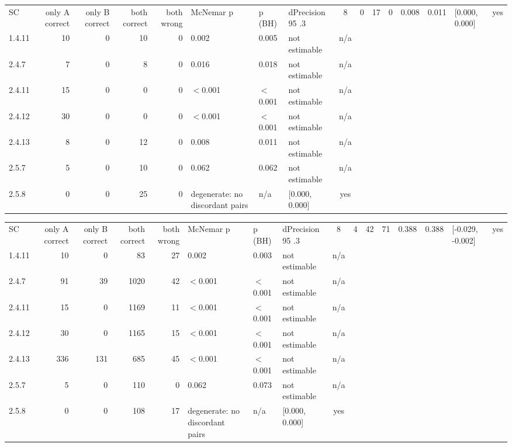 \begin{tabular}{lrrrrlllc}
\hline
SC & only A correct & only B correct & both correct & both wrong & McNemar p & p (BH) & dPrecision 95%
.3 & 8 & 0 & 17 & 0 & 0.008 & 0.011 & [0.000, 0.000] & yes \\
1.4.11 & 10 & 0 & 10 & 0 & 0.002 & 0.005 & not estimable & n/a \\
2.4.7 & 7 & 0 & 8 & 0 & 0.016 & 0.018 & not estimable & n/a \\
2.4.11 & 15 & 0 & 0 & 0 & $<$0.001 & $<$0.001 & not estimable & n/a \\
2.4.12 & 30 & 0 & 0 & 0 & $<$0.001 & $<$0.001 & not estimable & n/a \\
2.4.13 & 8 & 0 & 12 & 0 & 0.008 & 0.011 & not estimable & n/a \\
2.5.7 & 5 & 0 & 10 & 0 & 0.062 & 0.062 & not estimable & n/a \\
2.5.8 & 0 & 0 & 25 & 0 & degenerate: no discordant pairs & n/a & [0.000, 0.000] & yes \\
\hline
\end{tabular}

\begin{tabular}{lrrrrlllc}
\hline
SC & only A correct & only B correct & both correct & both wrong & McNemar p & p (BH) & dPrecision 95%
.3 & 8 & 4 & 42 & 71 & 0.388 & 0.388 & [-0.029, -0.002] & yes \\
1.4.11 & 10 & 0 & 83 & 27 & 0.002 & 0.003 & not estimable & n/a \\
2.4.7 & 91 & 39 & 1020 & 42 & $<$0.001 & $<$0.001 & not estimable & n/a \\
2.4.11 & 15 & 0 & 1169 & 11 & $<$0.001 & $<$0.001 & not estimable & n/a \\
2.4.12 & 30 & 0 & 1165 & 15 & $<$0.001 & $<$0.001 & not estimable & n/a \\
2.4.13 & 336 & 131 & 685 & 45 & $<$0.001 & $<$0.001 & not estimable & n/a \\
2.5.7 & 5 & 0 & 110 & 0 & 0.062 & 0.073 & not estimable & n/a \\
2.5.8 & 0 & 0 & 108 & 17 & degenerate: no discordant pairs & n/a & [0.000, 0.000] & yes \\
\hline
\end{tabular}

